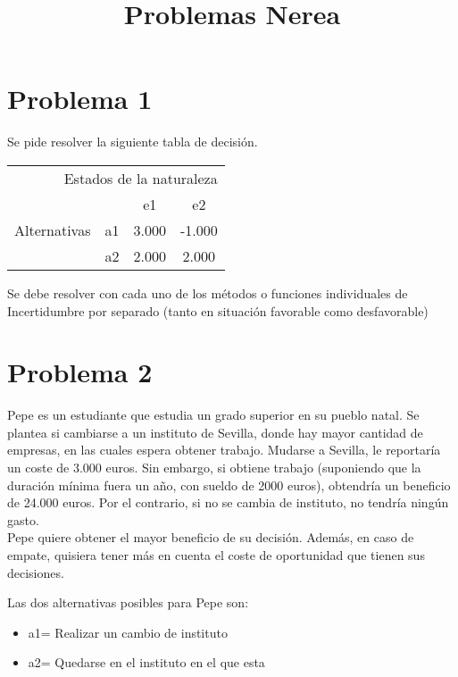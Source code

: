 \documentclass[12pt]{article}
\title{Problemas Nerea}
\date{}
\begin{document}
\maketitle

\section*{Problema 1}
Se pide resolver la siguiente tabla de decisión.

\begin{tabular}{c|c|c|c|}
\multicolumn{4}{r}{Estados de la naturaleza} \\
\cline{2-4}
\multirow{3}{*}{Alternativas} & & e1 & e2 \\
\cline{2-4}
 & a1 & 3.000 & -1.000\\
\cline{2-4}
 & a2 & 2.000 & 2.000 \\
\cline{2-4}
\end{tabular}

Se debe resolver con cada uno de los métodos o funciones individuales de Incertidumbre por separado (tanto en situación favorable como desfavorable)


\section*{Problema 2}


Pepe es un estudiante que estudia un grado superior en su pueblo natal. Se plantea si cambiarse a un instituto de Sevilla, donde hay mayor cantidad de empresas, en las cuales espera obtener trabajo. Mudarse a Sevilla, le reportaría un coste de 3.000 euros. Sin embargo, si obtiene trabajo (suponiendo que la duración mínima fuera un año, con sueldo de 2000 euros), obtendría un beneficio de 24.000 euros.
Por el contrario, si no se cambia de instituto, no tendría ningún gasto.\\

Pepe quiere obtener el mayor beneficio de su decisión. Además, en caso de empate, quisiera tener más en cuenta el coste de oportunidad que tienen sus decisiones.

Las dos alternativas posibles para Pepe son:\\

\begin{itemize}

\item a1= Realizar un cambio de instituto
\item a2= Quedarse en el instituto en el que esta

\end{itemize}
\end{document}
